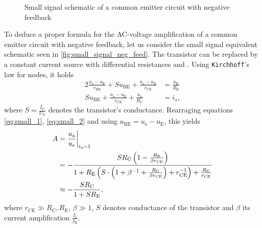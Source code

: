 \begin{figure}[tbp]
	\centering
	\caption{Small signal schematic of a common emitter circuit with negative feedback}
	\label{fig:small_signal_neg_feed}
\end{figure}

To deduce a proper formula for the AC-voltage amplification of a common emitter circuit with negative feedback, let us consider the small signal equivalent schematic seen in \autoref{fig:small_signal_neg_feed}.
The transistor can be replaced by a constant current source with differential resistances  and .
Using \texttt{Kirchhoff}'s law for nodes, it holds
\begin{alignat}{2}
	\frac{u_\text{e}-u_\text{E}}{r_\text{BE}}+Su_\text{BE}+\frac{u_\text{a}-u_\text{E}}{r_\text{CE}} &= \frac{u_\text{E}}{R_\text{E}} \label{eq:small_1}\\
	Su_\text{BE}+\frac{u_\text{a}-u_\text{E}}{r_\text{CE}} + \frac{u_\text{a}}{R_\text{C}}&= i_\text{a}, \label{eq:small_2}
\end{alignat}
where $S=\frac{I_\text{C}}{U_\text{T}}$ denotes the transistor's conductance.
Rearraging equations \ref{eq:small_1}, \ref{eq:small_2} and using $u_\text{BE}=u_\text{e}-u_\text{E}$, this yields
\begin{align}
	A&=\frac{u_\text{a}}{u_\text{e}}\at[\bigg]{i_\text{a}=1} \nonumber \\
	&=-\frac{SR_\text{C}\left(1-\frac{R_\text{E}}{\beta r_\text{CE}}\right)}{1+R_\text{E}\left(S\cdot\left(1+\beta^{-1}+\frac{R_\text{C}}{\beta r_\text{CE}}\right)+r_\text{CE}^{-1}\right)+\frac{R_\text{C}}{r_\text{CE}}} \nonumber \\
	&\approx -\frac{SR_\text{C}}{1+SR_\text{E}}, \label{eq:amp_neg_fb}
\end{align}
where $r_\text{CE}\gg R_\text{C},R_\text{E}$, $\beta\gg 1$, $S$ denotes conductance of the transistor and $\beta$ its current amplification $\frac{I_\text{c}}{I_\text{B}}$.

